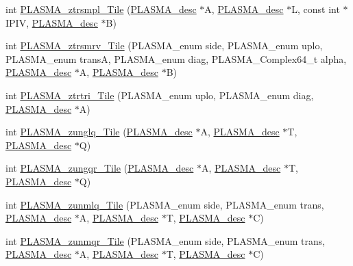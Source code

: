 \begin{DoxyCompactItemize}
\item 
int \hyperlink{group__PLASMA__Complex64__t__Tile_gafa2cffe6bac9513274a7811ca683d1a0_gafa2cffe6bac9513274a7811ca683d1a0}{P\+L\+A\+S\+M\+A\+\_\+ztrsmpl\+\_\+\+Tile} (\hyperlink{structplasma__desc__t}{P\+L\+A\+S\+M\+A\+\_\+desc} $\ast$A, \hyperlink{structplasma__desc__t}{P\+L\+A\+S\+M\+A\+\_\+desc} $\ast$L, const int $\ast$I\+P\+I\+V, \hyperlink{structplasma__desc__t}{P\+L\+A\+S\+M\+A\+\_\+desc} $\ast$B)
\item 
int \hyperlink{group__PLASMA__Complex64__t__Tile_ga8b1fcefe28db01449afb53ea924bf889_ga8b1fcefe28db01449afb53ea924bf889}{P\+L\+A\+S\+M\+A\+\_\+ztrsmrv\+\_\+\+Tile} (P\+L\+A\+S\+M\+A\+\_\+enum side, P\+L\+A\+S\+M\+A\+\_\+enum uplo, P\+L\+A\+S\+M\+A\+\_\+enum trans\+A, P\+L\+A\+S\+M\+A\+\_\+enum diag, P\+L\+A\+S\+M\+A\+\_\+\+Complex64\+\_\+t alpha, \hyperlink{structplasma__desc__t}{P\+L\+A\+S\+M\+A\+\_\+desc} $\ast$A, \hyperlink{structplasma__desc__t}{P\+L\+A\+S\+M\+A\+\_\+desc} $\ast$B)
\item 
int \hyperlink{group__PLASMA__Complex64__t__Tile_ga3f573d99647fde05cf8db6dca201a564_ga3f573d99647fde05cf8db6dca201a564}{P\+L\+A\+S\+M\+A\+\_\+ztrtri\+\_\+\+Tile} (P\+L\+A\+S\+M\+A\+\_\+enum uplo, P\+L\+A\+S\+M\+A\+\_\+enum diag, \hyperlink{structplasma__desc__t}{P\+L\+A\+S\+M\+A\+\_\+desc} $\ast$A)
\item 
int \hyperlink{group__PLASMA__Complex64__t__Tile_ga6b36db3de0fe6436ea85432a40fb4024_ga6b36db3de0fe6436ea85432a40fb4024}{P\+L\+A\+S\+M\+A\+\_\+zunglq\+\_\+\+Tile} (\hyperlink{structplasma__desc__t}{P\+L\+A\+S\+M\+A\+\_\+desc} $\ast$A, \hyperlink{structplasma__desc__t}{P\+L\+A\+S\+M\+A\+\_\+desc} $\ast$T, \hyperlink{structplasma__desc__t}{P\+L\+A\+S\+M\+A\+\_\+desc} $\ast$Q)
\item 
int \hyperlink{group__PLASMA__Complex64__t__Tile_ga95b4202db333c7547d3459d7b909fcd6_ga95b4202db333c7547d3459d7b909fcd6}{P\+L\+A\+S\+M\+A\+\_\+zungqr\+\_\+\+Tile} (\hyperlink{structplasma__desc__t}{P\+L\+A\+S\+M\+A\+\_\+desc} $\ast$A, \hyperlink{structplasma__desc__t}{P\+L\+A\+S\+M\+A\+\_\+desc} $\ast$T, \hyperlink{structplasma__desc__t}{P\+L\+A\+S\+M\+A\+\_\+desc} $\ast$Q)
\item 
int \hyperlink{group__PLASMA__Complex64__t__Tile_gad9b76883d0fe796b0dd8eaadef158d6b_gad9b76883d0fe796b0dd8eaadef158d6b}{P\+L\+A\+S\+M\+A\+\_\+zunmlq\+\_\+\+Tile} (P\+L\+A\+S\+M\+A\+\_\+enum side, P\+L\+A\+S\+M\+A\+\_\+enum trans, \hyperlink{structplasma__desc__t}{P\+L\+A\+S\+M\+A\+\_\+desc} $\ast$A, \hyperlink{structplasma__desc__t}{P\+L\+A\+S\+M\+A\+\_\+desc} $\ast$T, \hyperlink{structplasma__desc__t}{P\+L\+A\+S\+M\+A\+\_\+desc} $\ast$C)
\item 
int \hyperlink{group__PLASMA__Complex64__t__Tile_ga52c9965e4609c082ae9b976764fdd1c7_ga52c9965e4609c082ae9b976764fdd1c7}{P\+L\+A\+S\+M\+A\+\_\+zunmqr\+\_\+\+Tile} (P\+L\+A\+S\+M\+A\+\_\+enum side, P\+L\+A\+S\+M\+A\+\_\+enum trans, \hyperlink{structplasma__desc__t}{P\+L\+A\+S\+M\+A\+\_\+desc} $\ast$A, \hyperlink{structplasma__desc__t}{P\+L\+A\+S\+M\+A\+\_\+desc} $\ast$T, \hyperlink{structplasma__desc__t}{P\+L\+A\+S\+M\+A\+\_\+desc} $\ast$C)
\end{DoxyCompactItemize}



